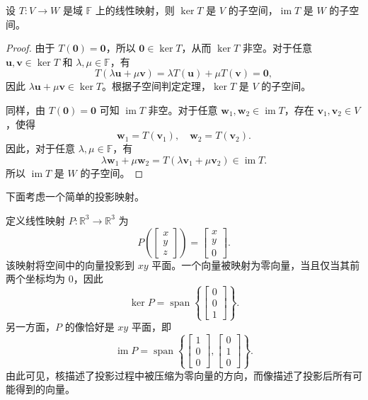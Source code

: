 \begin{proposition}
    \label{prop_kernel_image_subspaces}
    设 \(T:V\to W\) 是域 \(\mathbb F\) 上的线性映射，则 \(\ker T\) 是 \(V\) 的子空间，\(\operatorname{im}T\) 是 \(W\) 的子空间。
\end{proposition}
\begin{proof}
    由于 \(T(\bm 0)=\bm 0\)，所以 \(\bm 0\in\ker T\)，从而 \(\ker T\) 非空。对于任意 \(\bm u,\bm v\in\ker T\) 和 \(\lambda,\mu\in\mathbb F\)，有
    \[
        T(\lambda\bm u+\mu\bm v)
        =\lambda T(\bm u)+\mu T(\bm v)
        =\bm 0,
    \]
    因此 \(\lambda\bm u+\mu\bm v\in\ker T\)。根据子空间判定定理，\(\ker T\) 是 \(V\) 的子空间。

    同样，由 \(T(\bm 0)=\bm 0\) 可知 \(\operatorname{im}T\) 非空。对于任意 \(\bm w_1,\bm w_2\in\operatorname{im}T\)，存在 \(\bm v_1,\bm v_2\in V\)，使得
    \[
        \bm w_1=T(\bm v_1),
        \quad
        \bm w_2=T(\bm v_2).
    \]
    因此，对于任意 \(\lambda,\mu\in\mathbb F\)，有
    \[
        \lambda\bm w_1+\mu\bm w_2
        =T(\lambda\bm v_1+\mu\bm v_2)
        \in\operatorname{im}T.
    \]
    所以 \(\operatorname{im}T\) 是 \(W\) 的子空间。
\end{proof}

下面考虑一个简单的投影映射。
\begin{example}
    \label{ex_projection_kernel_image}
    定义线性映射 \(P:\mathbb R^3\to\mathbb R^3\) 为
    \[
        P\left(\begin{bmatrix}x\\y\\z\end{bmatrix}\right)
        =\begin{bmatrix}x\\y\\0\end{bmatrix}.
    \]
    该映射将空间中的向量投影到 \(xy\) 平面。一个向量被映射为零向量，当且仅当其前两个坐标均为 \(0\)，因此
    \[
        \ker P
        =\operatorname{span}\left\{
        \begin{bmatrix}0\\0\\1\end{bmatrix}
        \right\}.
    \]
    另一方面，\(P\) 的像恰好是 \(xy\) 平面，即
    \[
        \operatorname{im}P
        =\operatorname{span}\left\{
        \begin{bmatrix}1\\0\\0\end{bmatrix},
        \begin{bmatrix}0\\1\\0\end{bmatrix}
        \right\}.
    \]
    由此可见，核描述了投影过程中被压缩为零向量的方向，而像描述了投影后所有可能得到的向量。
\end{example}

